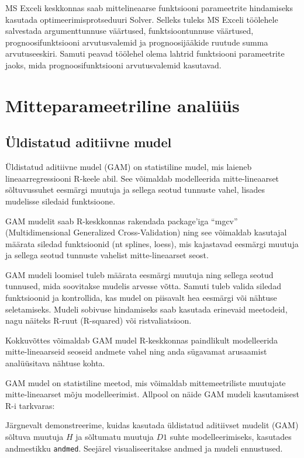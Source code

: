 \documentclass[
]{book}
\begin{document}
MS Exceli keskkonnas saab mittelineaarse funktsiooni parameetrite hindamiseks kasutada optimeerimisprotseduuri Solver. Selleks tuleks MS Exceli töölehele salvestada argumenttunnuse väärtused, funktsioontunnuse väärtused, prognoosifunktsiooni arvutusvalemid ja prognoosijääkide ruutude summa arvutuseeskiri. Samuti peavad töölehel olema lahtrid funktsiooni parameetrite jaoks, mida prognoosifunktsiooni arvutusvalemid kasutavad.

\chapter{Mitteparameetriline analüüs}\label{mitteparameetriline-analuxfcuxfcs}

\section{Üldistatud aditiivne mudel}\label{uxfcldistatud-aditiivne-mudel}

Üldistatud aditiivne mudel (GAM) on statistiline mudel, mis laieneb lineaarregressiooni R-keele abil. See võimaldab modelleerida mitte-lineaarset sõltuvussuhet eesmärgi muutuja ja sellega seotud tunnuste vahel, lisades mudelisse siledaid funktsioone.

GAM mudelit saab R-keskkonnas rakendada package'iga ``mgcv'' (Multidimensional Generalized Cross-Validation) ning see võimaldab kasutajal määrata siledad funktsioonid (nt splines, loess), mis kajastavad eesmärgi muutuja ja sellega seotud tunnuste vahelist mitte-lineaarset seost.

GAM mudeli loomisel tuleb määrata eesmärgi muutuja ning sellega seotud tunnused, mida soovitakse mudelis arvesse võtta. Samuti tuleb valida siledad funktsioonid ja kontrollida, kas mudel on piisavalt hea eesmärgi või nähtuse seletamiseks. Mudeli sobivuse hindamiseks saab kasutada erinevaid meetodeid, nagu näiteks R-ruut (R-squared) või ristvaliatsioon.

Kokkuvõttes võimaldab GAM mudel R-keskkonnas paindlikult modelleerida mitte-lineaarseid seoseid andmete vahel ning anda sügavamat arusaamist analüüsitava nähtuse kohta.

GAM mudel on statistiline meetod, mis võimaldab mittemeetriliste muutujate mitte-lineaarset mõju modelleerimist. Allpool on näide GAM mudeli kasutamisest R-i tarkvaras:

Järgnevalt demonstreerime, kuidas kasutada üldistatud aditiivset mudelit (GAM) sõltuva muutuja \(H\) ja sõltumatu muutuja \(D1\) suhte modelleerimiseks, kasutades andmestikku \texttt{andmed}. Seejärel visualiseeritakse andmed ja mudeli ennustused.
\end{document}
